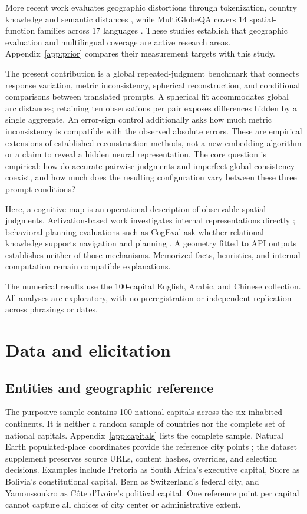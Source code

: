 \documentclass[12pt,a4paper]{article}
\begin{document}
More recent work evaluates geographic distortions through tokenization, country knowledge and semantic distances \cite{decoupes}, while MultiGlobeQA covers 14 spatial-function families across 17 languages \cite{multiglobe}. These studies establish that geographic evaluation and multilingual coverage are active research areas. Appendix~\ref{app:prior} compares their measurement targets with this study.

The present contribution is a global repeated-judgment benchmark that connects response variation, metric inconsistency, spherical reconstruction, and conditional comparisons between translated prompts. A spherical fit accommodates global arc distances; retaining ten observations per pair exposes differences hidden by a single aggregate. An error-sign control additionally asks how much metric inconsistency is compatible with the observed absolute errors. These are empirical extensions of established reconstruction methods, not a new embedding algorithm or a claim to reveal a hidden neural representation. The core question is empirical: how do accurate pairwise judgments and imperfect global consistency coexist, and how much does the resulting configuration vary between these three prompt conditions?

Here, a cognitive map is an operational description of observable spatial judgments. Activation-based work investigates internal representations directly \cite{gurnee}; behavioral planning evaluations such as CogEval ask whether relational knowledge supports navigation and planning \cite{cogeval}. A geometry fitted to API outputs establishes neither of those mechanisms. Memorized facts, heuristics, and internal computation remain compatible explanations.

The numerical results use the 100-capital English, Arabic, and Chinese collection. All analyses are exploratory, with no preregistration or independent replication across phrasings or dates.

\section{Data and elicitation}
\subsection{Entities and geographic reference}
The purposive sample contains 100 national capitals across the six inhabited continents. It is neither a random sample of countries nor the complete set of national capitals. Appendix~\ref{app:capitals} lists the complete sample. Natural Earth populated-place coordinates provide the reference city points \cite{naturalearth,neterms}; the dataset supplement preserves source URLs, content hashes, overrides, and selection decisions. Examples include Pretoria as South Africa's executive capital, Sucre as Bolivia's constitutional capital, Bern as Switzerland's federal city, and Yamoussoukro as C\^ote d'Ivoire's political capital. One reference point per capital cannot capture all choices of city center or administrative extent.
\end{document}
